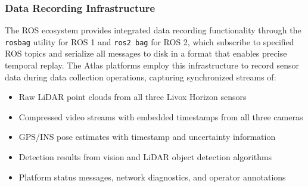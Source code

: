 


\subsubsection{Data Recording Infrastructure}

The ROS ecosystem provides integrated data recording functionality through the \texttt{rosbag} utility for ROS 1 and \texttt{ros2 bag} for ROS 2, which subscribe to specified ROS topics and serialize all messages to disk in a format that enables precise temporal replay.
The Atlas platforms employ this infrastructure to record sensor data during data collection operations, capturing synchronized streams of:

\begin{itemize}
\item Raw LiDAR point clouds from all three Livox Horizon sensors
\item Compressed video streams with embedded timestamps from all three cameras
\item GPS/INS pose estimates with timestamp and uncertainty information
\item Detection results from vision and LiDAR object detection algorithms
\item Platform status messages, network diagnostics, and operator annotations
\end{itemize}

